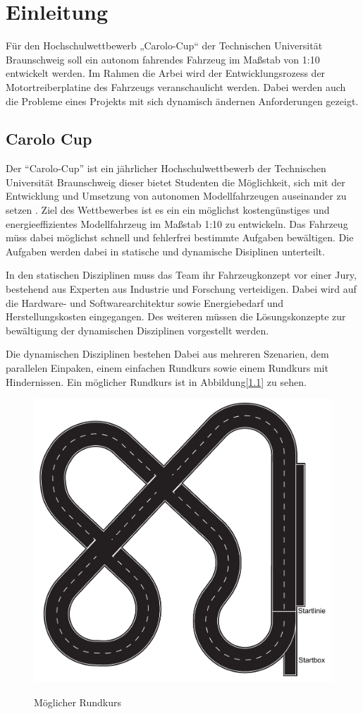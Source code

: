 \chapter{Einleitung}

Für den Hochschulwettbewerb „Carolo-Cup“ der Technischen Universität Braunschweig soll ein autonom fahrendes Fahrzeug im Maßstab von 1:10
entwickelt werden. Im Rahmen die Arbei wird der Entwicklungsrozess der Motortreiberplatine des Fahrzeugs veranschaulicht werden.
Dabei werden auch die Probleme eines Projekts mit sich dynamisch ändernen Anforderungen gezeigt. 


\section{Carolo Cup}
Der ``Carolo-Cup'' ist ein jährlicher Hochschulwettbewerb der Technischen Universität Braunschweig dieser bietet Studenten die Möglichkeit, sich mit der Entwicklung 
und Umsetzung von autonomen Modellfahrzeugen auseinander zu setzen \cite{website-carolo-cup}. Ziel des Wettbewerbes ist es ein ein möglichst kostengünstiges
und energieeffizientes Modellfahrzeug im Maßstab 1:10 zu entwickeln. Das Fahrzeug müss dabei möglichst schnell und fehlerfrei bestimmte Aufgaben
bewältigen. Die Aufgaben werden dabei in statische und dynamische Disiplinen unterteilt. 

In den statischen Disziplinen muss das Team ihr Fahrzeugkonzept vor einer Jury, bestehend aus Experten aus Industrie und Forschung verteidigen.
Dabei wird auf die Hardware- und Softwarearchitektur sowie Energiebedarf und Herstellungskosten eingegangen. Des weiteren müssen die Lösungskonzepte
zur bewältigung der dynamischen Disziplinen vorgestellt werden.

Die dynamischen Disziplinen bestehen Dabei aus mehreren Szenarien, dem parallelen Einpaken, einem einfachen Rundkurs sowie einem Rundkurs mit Hindernissen.
Ein möglicher Rundkurs ist in Abbildung[\ref{fig:Rundkurs}] zu sehen.

\begin{figure}[H]
\centering
\includegraphics[width=.8\textwidth]{Strecke.png}\\
\caption{Möglicher Rundkurs \cite{website-carolo-cup-regelwerk}}
\label{fig:Rundkurs}
\end{figure}


